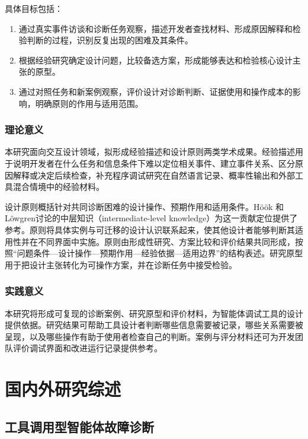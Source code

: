 具体目标包括：

\begin{enumerate}
\item 通过真实事件访谈和诊断任务观察，描述开发者查找材料、形成原因解释和检验判断的过程，识别反复出现的困难及其条件。
\item 根据经验研究确定设计问题，比较备选方案，形成能够表达和检验核心设计主张的原型。
\item 通过对照任务和新案例观察，评价设计对诊断判断、证据使用和操作成本的影响，明确原则的作用与适用范围。
\end{enumerate}

\subsubsection{理论意义}

本研究面向交互设计领域，拟形成经验描述和设计原则两类学术成果。经验描述用于说明开发者在什么任务和信息条件下难以定位相关事件、建立事件关系、区分原因解释或决定后续检查，补充程序调试研究在自然语言记录、概率性输出和外部工具混合情境中的经验材料。

设计原则概括针对共同诊断困难的设计操作、预期作用和适用条件。Höök 和 Löwgren\cite{hook2012strong}讨论的中层知识（intermediate-level knowledge）为这一贡献定位提供了参考。原则将具体实例与可迁移的设计认识联系起来，使其他设计者能够判断其适用性并在不同界面中实施。原则由形成性研究、方案比较和评价结果共同形成，按照“问题条件—设计操作—预期作用—经验依据—适用边界”的结构表述。研究原型用于把设计主张转化为可操作方案，并在诊断任务中接受检验。

\subsubsection{实践意义}

本研究将形成可复现的诊断案例、研究原型和评价材料，为智能体调试工具的设计提供依据。研究结果可帮助工具设计者判断哪些信息需要被记录，哪些关系需要被呈现，以及哪些操作有助于使用者检查自己的判断。案例与评分材料还可为开发团队评价调试界面和改进运行记录提供参考。

\section{国内外研究综述}

\subsection{工具调用型智能体故障诊断}

